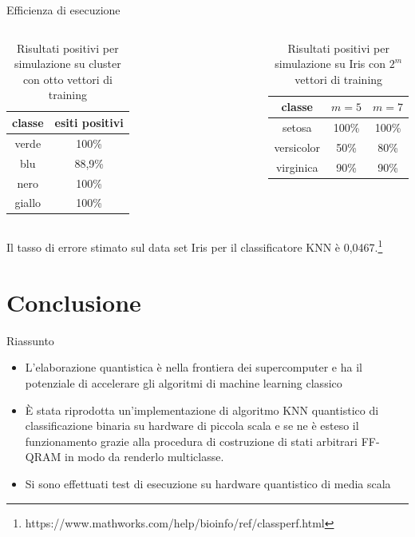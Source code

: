 \documentclass{beamer}
\begin{document}
    \begin{frame}{Efficienza di esecuzione}
        \begin{columns}
            \begin{table}[h!]
                \centering
                \begin{tabular}{c c}
                    classe & esiti positivi\\
                    \hline
                    verde & 100\%\\
                    blu & 88,9\%\\
                    nero & 100\%\\
                    giallo & 100\%
                \end{tabular}
                \caption{Risultati positivi per simulazione su cluster con otto vettori di training}
            \end{table}    
            \begin{table}[h!]
                \centering
                \begin{tabular}{c c c}
                    classe & $m=5$ & $m=7$ \\ 
                    \hline
                    setosa & 100\% & 100\%\\ 
                    versicolor & 50\% & 80\%\\ 
                    virginica & 90\% & 90\%
                \end{tabular}
                \caption{Risultati positivi per simulazione su Iris con $2^m$ vettori di training}
                \label{table:misure}
            \end{table}
        \end{columns}
        Il tasso di errore stimato sul data set Iris per il classificatore KNN è 0,0467.\footnote{https://www.mathworks.com/help/bioinfo/ref/classperf.html}
    \end{frame}

    \section{Conclusione}

    \begin{frame}{Riassunto}
        \begin{itemize}
            \item L'elaborazione quantistica è nella frontiera dei supercomputer e ha il potenziale di accelerare gli algoritmi di machine learning classico
            \item È stata riprodotta un'implementazione di algoritmo KNN quantistico di classificazione binaria su hardware di piccola scala e 
            se ne è esteso il funzionamento grazie alla procedura di costruzione di stati arbitrari FF-QRAM in modo da renderlo multiclasse. 
            \item Si sono effettuati test di esecuzione su hardware quantistico di media scala
        \end{itemize}
    \end{frame}
\end{document}
